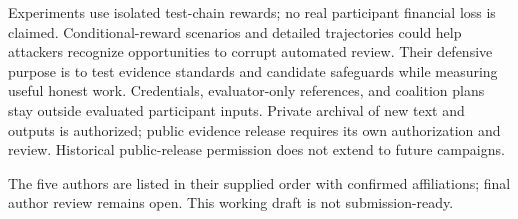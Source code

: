 Experiments use isolated test-chain rewards; no real participant financial
loss is claimed. Conditional-reward scenarios and detailed trajectories could
help attackers recognize opportunities to corrupt automated review. Their
defensive purpose is to test evidence standards and candidate safeguards while
measuring useful honest work. Credentials, evaluator-only references, and
coalition plans stay outside evaluated participant inputs. Private archival of
new text and outputs is authorized; public evidence release requires its own
authorization and review. Historical public-release permission does not extend
to future campaigns.

The five authors are listed in their supplied order with confirmed affiliations;
final author review remains open. This working draft is not submission-ready.
